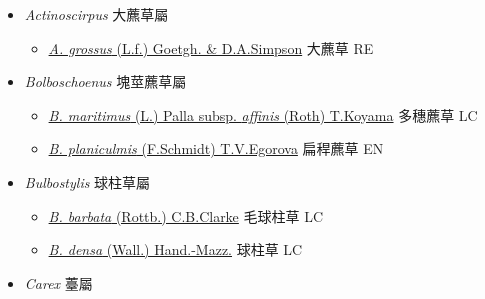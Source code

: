 
  \begin{itemize}
 \item[] \textit{Actinoscirpus} 大藨草屬
                    
  \begin{itemize}
        \item[] \href{http://www.theplantlist.org/tpl1.1/search?q=Actinoscirpus+grossus}{\textit{A. grossus} (L.f.) Goetgh. \& D.A.Simpson}   大藨草 RE
  \end{itemize}
 \item[] \textit{Bolboschoenus} 塊莖藨草屬
                    
  \begin{itemize}
        \item[] \href{http://www.theplantlist.org/tpl1.1/search?q=Bolboschoenus+maritimus+subsp.+affinis}{\textit{B. maritimus} (L.) Palla subsp. \textit{affinis} (Roth) T.Koyama}   多穗藨草 LC
        \item[] \href{http://www.theplantlist.org/tpl1.1/search?q=Bolboschoenus+planiculmis}{\textit{B. planiculmis} (F.Schmidt) T.V.Egorova}   扁稈藨草 EN
  \end{itemize}
 \item[] \textit{Bulbostylis} 球柱草屬
                    
  \begin{itemize}
        \item[] \href{http://www.theplantlist.org/tpl1.1/search?q=Bulbostylis+barbata}{\textit{B. barbata} (Rottb.) C.B.Clarke}   毛球柱草 LC
        \item[] \href{http://www.theplantlist.org/tpl1.1/search?q=Bulbostylis+densa}{\textit{B. densa} (Wall.) Hand.-Mazz.}   球柱草 LC
  \end{itemize}
 \item[] \textit{Carex} 薹屬
                    

\end{itemize}
